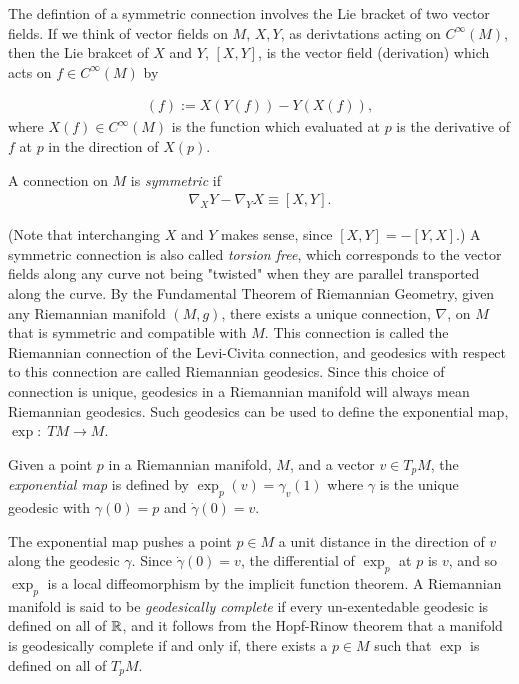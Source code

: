 The defintion of a symmetric connection involves the Lie bracket of two vector fields. If we think of vector fields on $M$, $X, Y$, as derivtations acting on $C^\infty (M)$, then the Lie brakcet of $X$ and $Y$, $[X , Y]$, is the vector field (derivation) which acts on $f \in C^\infty (M)$ by

\begin{align*}
[X , Y] (f) := X(Y(f)) - Y(X(f)),
\end{align*}
where $X(f) \in C^\infty (M)$ is the function which evaluated at $p$ is the derivative of $f$ at $p$ in the direction of $X(p)$. 

\begin{definition}
A connection on $M$ is \textit{symmetric} if 
\begin{align*}
\nabla_X Y - \nabla_Y X \equiv [X, Y].
\end{align*}
\end{definition}

(Note that interchanging $X$ and $Y$ makes sense, since $[X, Y] = - [Y, X]$.) A symmetric connection is also called \textit{torsion free}, which corresponds to the vector fields along any curve not being "twisted" when they are parallel transported along the curve. By the Fundamental Theorem of Riemannian Geometry, given any Riemannian manifold $(M,g)$, there exists a unique connection, $\nabla$, on $M$ that is symmetric and compatible with $M$. This connection is called the Riemannian connection of the Levi-Civita connection, and geodesics with respect to this connection are called Riemannian geodesics. Since this choice of connection is unique, geodesics in a Riemannian manifold will always mean Riemannian geodesics. Such geodesics can be used to define the exponential map, $\exp: \; TM \rightarrow M$.  

\begin{definition}
Given a point $p$ in a Riemannian manifold, $M$, and a vector $v \in T_p M$, the \textit{exponential map} is defined by $\exp_p (v) = \gamma_v(1)$ where $\gamma$ is the unique geodesic with $\gamma(0) = p$ and $\dot{\gamma}(0) = v$.
\end{definition}

The exponential map pushes a point $p \in M$ a unit distance in the direction of $v$ along the geodesic $\gamma$. Since $\dot{\gamma}(0) = v$, the differential of $\exp_p$ at $p$ is $v$, and so $\exp_p$ is a local diffeomorphism by the implicit function theorem. A Riemannian manifold is said to be \textit{geodesically complete} if every un-exentedable geodesic is defined on all of $\mathbb{R}$, and it follows from the Hopf-Rinow theorem that a manifold is geodesically complete if and only if, there exists a $p \in M$ such that $\exp$ is defined on all of $T_p M$. 

